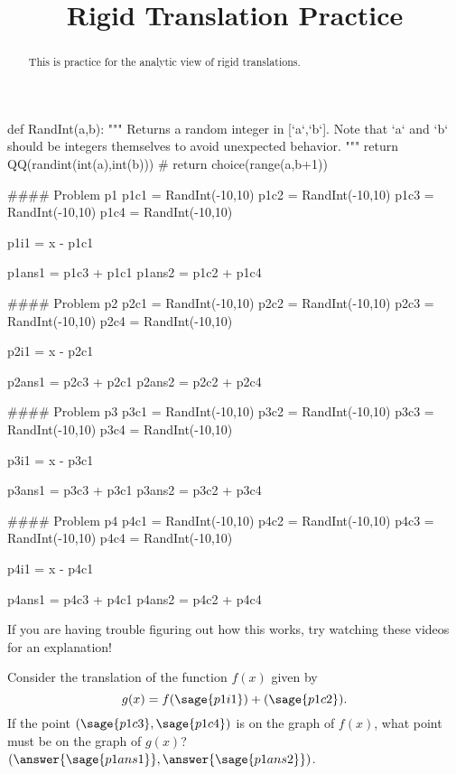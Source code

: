 \documentclass{ximera}
\title{Rigid Translation Practice}
\begin{document}
\begin{abstract}
    This is practice for the analytic view of rigid translations.
\end{abstract}
\maketitle

\begin{sagesilent}
def RandInt(a,b):
    """ Returns a random integer in [`a`,`b`]. Note that `a` and `b` should be integers themselves to avoid unexpected behavior.
    """
    return QQ(randint(int(a),int(b)))
    # return choice(range(a,b+1))

#### Problem p1
p1c1 = RandInt(-10,10)
p1c2 = RandInt(-10,10)
p1c3 = RandInt(-10,10)
p1c4 = RandInt(-10,10)

p1i1 = x - p1c1

p1ans1 = p1c3 + p1c1
p1ans2 = p1c2 + p1c4


#### Problem p2
p2c1 = RandInt(-10,10)
p2c2 = RandInt(-10,10)
p2c3 = RandInt(-10,10)
p2c4 = RandInt(-10,10)

p2i1 = x - p2c1

p2ans1 = p2c3 + p2c1
p2ans2 = p2c2 + p2c4


#### Problem p3
p3c1 = RandInt(-10,10)
p3c2 = RandInt(-10,10)
p3c3 = RandInt(-10,10)
p3c4 = RandInt(-10,10)

p3i1 = x - p3c1

p3ans1 = p3c3 + p3c1
p3ans2 = p3c2 + p3c4


#### Problem p4
p4c1 = RandInt(-10,10)
p4c2 = RandInt(-10,10)
p4c3 = RandInt(-10,10)
p4c4 = RandInt(-10,10)

p4i1 = x - p4c1

p4ans1 = p4c3 + p4c1
p4ans2 = p4c2 + p4c4



\end{sagesilent}


If you are having trouble figuring out how this works, try watching these videos for an explanation!



\begin{problem}
    Consider the translation of the function $f(x)$ given by 
    \[
        g(x) = f( \sage{p1i1} ) + (\sage{p1c2}).
    \] 
    If the point $(\sage{p1c3}, \sage{p1c4})$ is on the graph of $f(x)$, what point must be on the graph of $g(x)$? $(\answer{\sage{p1ans1}},\answer{\sage{p1ans2}})$.
\end{problem}
\end{document}
